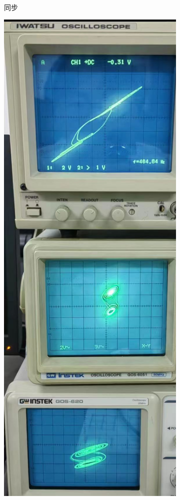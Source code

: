 \documentclass[12pt,a4paper]{article}
\begin{document}
\begin{figure}[H]
\begin{subfigure}[b]{0.3\textwidth}
      \caption{同步}
    \end{subfigure}
    \hfill
    \begin{subfigure}[b]{0.3\textwidth}
      \centering
      \includegraphics[width=\textwidth]{准同步.jpg}

\end{subfigure}
\end{figure}
\end{document}
